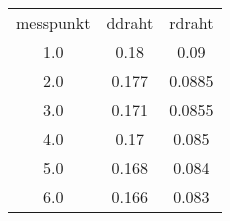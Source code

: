 \begin{table}
\begin{tabular}{ccc}
messpunkt & ddraht & rdraht \\
1.0 & 0.18 & 0.09 \\
2.0 & 0.177 & 0.0885 \\
3.0 & 0.171 & 0.0855 \\
4.0 & 0.17 & 0.085 \\
5.0 & 0.168 & 0.084 \\
6.0 & 0.166 & 0.083 \\
\end{tabular}
\end{table}
